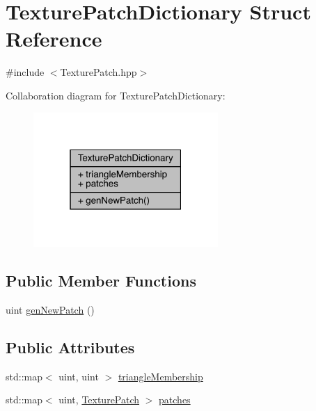 \hypertarget{struct_texture_patch_dictionary}{}\section{Texture\+Patch\+Dictionary Struct Reference}
\label{struct_texture_patch_dictionary}


{\ttfamily \#include $<$Texture\+Patch.\+hpp$>$}



Collaboration diagram for Texture\+Patch\+Dictionary\+:\nopagebreak
\begin{figure}[H]
\begin{center}
\leavevmode
\includegraphics[width=199pt]{struct_texture_patch_dictionary__coll__graph}
\end{center}
\end{figure}
\subsection*{Public Member Functions}
\begin{DoxyCompactItemize}
\item 
uint \hyperlink{struct_texture_patch_dictionary_aba62d1d0383da168f7bdef1050970a92}{gen\+New\+Patch} ()
\end{DoxyCompactItemize}
\subsection*{Public Attributes}
\begin{DoxyCompactItemize}
\item 
std\+::map$<$ uint, uint $>$ \hyperlink{struct_texture_patch_dictionary_a188d2b68586a902ef8c969458e9001c6}{triangle\+Membership}
\item 
std\+::map$<$ uint, \hyperlink{struct_texture_patch}{Texture\+Patch} $>$ \hyperlink{struct_texture_patch_dictionary_a21c6633d4831bd84be792b45020f3805}{patches}
\end{DoxyCompactItemize}


